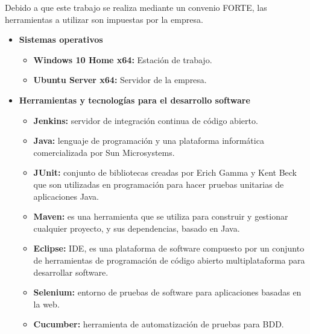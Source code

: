Debido a que este trabajo se realiza mediante un convenio FORTE, las herramientas a utilizar son impuestas por la empresa.

\begin{itemize}
\item \textbf{Sistemas operativos}
\begin{itemize}
\item \textbf{Windows 10 Home x64: }Estación de trabajo.
\item \textbf{Ubuntu Server x64: }Servidor de la empresa.
\end{itemize}
\end{itemize}

\begin{itemize}
\item \textbf{Herramientas y tecnologías para el desarrollo software}
\begin{itemize}
\item \textbf{Jenkins: }servidor de integración continua de código abierto\cite{Jenkins}.
\end{itemize}
\begin{itemize}
\item \textbf{Java: }lenguaje de programación y una plataforma informática comercializada por Sun Microsystems\cite{Java}.
\end{itemize}
\begin{itemize}
\item \textbf{JUnit: }conjunto de bibliotecas creadas por Erich Gamma y Kent Beck que son utilizadas en programación para hacer pruebas unitarias de aplicaciones Java\cite{JUnit}.
\end{itemize}
\begin{itemize}
\item \textbf{Maven: }es una herramienta que se utiliza para construir y gestionar cualquier proyecto, y sus dependencias, basado en Java.
\end{itemize}
\begin{itemize}
\item \textbf{Eclipse: }\ac{IDE}, es una plataforma de software compuesto por un conjunto de herramientas de programación de código abierto multiplataforma para desarrollar software\cite{Eclipse}.
\end{itemize}
\begin{itemize}
\item \textbf{Selenium: }entorno de pruebas de software para aplicaciones basadas en la web\cite{Selenium}.
\end{itemize}
\begin{itemize}
\item \textbf{Cucumber: }herramienta de automatización de pruebas\cite{Cucumber} para \ac{BDD}.
\end{itemize}
\end{itemize}

